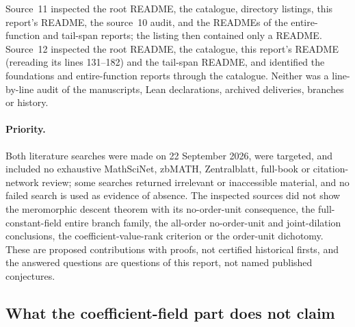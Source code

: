 \documentclass[11pt]{article}
\numberwithin{equation}{section}
\theoremstyle{definition}
\theoremstyle{remark}
\begin{document}
Source~11 inspected the root README, the catalogue, directory listings, this
report's README, the source~10 audit, and the READMEs of the entire-function
and tail-span reports; the  listing then contained only a
README. Source~12 inspected the root README, the catalogue, this report's
README (rereading its lines 131--182) and the tail-span README, and
identified the foundations and entire-function reports through the
catalogue. Neither was a line-by-line audit of the manuscripts, Lean
declarations, archived deliveries, branches or history.

\paragraph{Priority.}
Both literature searches were made on 22 September 2026, were targeted, and
included no exhaustive MathSciNet, zbMATH, Zentralblatt, full-book or
citation-network review; some searches returned irrelevant or inaccessible
material, and no failed search is used as evidence of absence. The inspected
sources did not show the meromorphic descent theorem with its no-order-unit
consequence, the full-constant-field entire branch family, the all-order
no-order-unit and joint-dilation conclusions, the coefficient-value-rank
criterion or the order-unit dichotomy. These are proposed contributions with
proofs, not certified historical firsts, and the answered questions are
questions of this report, not named published conjectures.

\subsection{What the coefficient-field part does not claim}
\label{hol:cf:sub:nonclaims}
\end{document}

